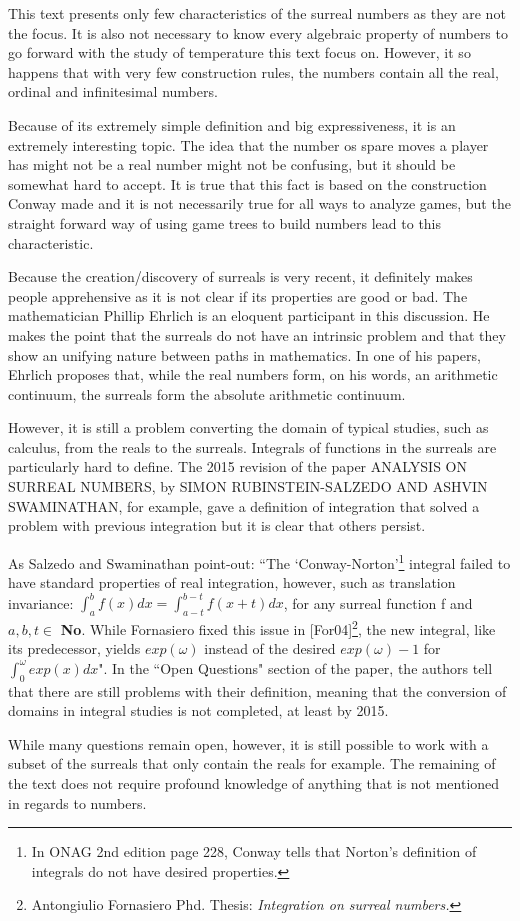 This text presents only few characteristics of the surreal numbers as they are not the focus. It is also not necessary to know every algebraic property of numbers to go forward with the study of temperature this text focus on. However, it so happens that with very few construction rules, the numbers contain all the real, ordinal and infinitesimal numbers.

Because of its extremely simple definition and big expressiveness, it is an extremely interesting topic. The idea that the number os spare moves a player has might not be a real number might not be confusing, but it should be somewhat hard to accept. It is true that this fact is based on the construction Conway made and it is not necessarily true for all ways to analyze games, but the straight forward way of using game trees to build numbers lead to this characteristic.

Because the creation/discovery of surreals is very recent, it definitely makes people apprehensive as it is not clear if its properties are good or bad. The mathematician Phillip Ehrlich is an eloquent participant in this discussion. He makes the point that the surreals do not have an intrinsic problem and that they show an unifying nature between paths in mathematics. In one of his papers, Ehrlich proposes that, while the real numbers form, on his words, an arithmetic continuum, the surreals form the absolute arithmetic continuum.

However, it is still a problem converting the domain of typical studies, such as calculus, from the reals to the surreals. Integrals of functions in the surreals are particularly hard to define. The 2015 revision of the paper ANALYSIS ON SURREAL NUMBERS, by SIMON RUBINSTEIN-SALZEDO AND ASHVIN SWAMINATHAN, for example, gave a definition of integration that solved a problem with previous integration but it is clear that others persist.

As Salzedo and Swaminathan point-out: ``The `Conway-Norton'\footnote{In ONAG 2nd edition page 228, Conway  tells that Norton's definition of integrals do not have desired properties.}
integral failed to have standard properties of real integration, however, such as translation
invariance: $\int_a^bf(x)dx = \int_{a-t}^{b-t}f(x+t)dx$, for any surreal function f and $a,b,t\in$ \textbf{No}. While Fornasiero fixed this issue in [For04]\footnote{Antongiulio Fornasiero Phd. Thesis: \textit{Integration on surreal numbers.}}, the new integral, like its predecessor, yields
$exp(\omega)$ instead of the desired $exp(\omega)-1$ for $\int_0^{\omega}exp(x)dx$". In the ``Open Questions" section of  the paper, the authors tell that there are still problems with their definition, meaning that the conversion of domains in integral studies is not completed, at least by 2015.

While many questions remain open, however, it is still possible to work with a subset of the surreals that only contain the reals for example. The remaining of the text does not require profound knowledge of anything that is not mentioned in regards to numbers.









